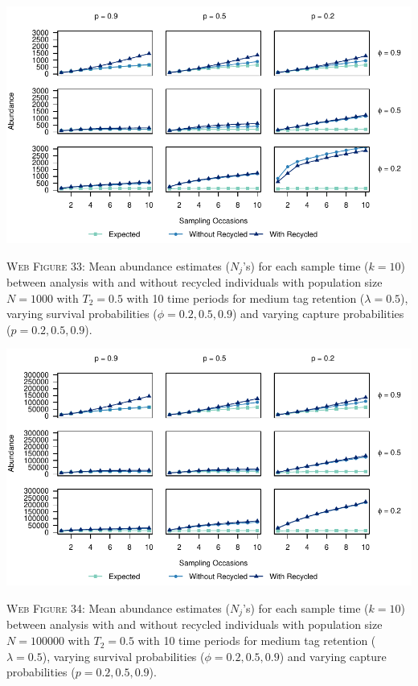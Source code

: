 \documentclass[]{article}
\begin{document}
\includegraphics{Appendix_files/figure-latex/33_abundance_M_GJSTL4-1.pdf}

\textsc{Web Figure 33:} Mean abundance estimates (\(N_j\)'s) for each
sample time (\(k=10\)) between analysis with and without recycled
individuals with population size \(N=1000\) with \(T_2=0.5\) with 10
time periods for medium tag retention (\(\lambda=0.5\)), varying
survival probabilities (\(\phi=0.2,0.5,0.9\)) and varying capture
probabilities (\(p=0.2,0.5,0.9\)).

\includegraphics{Appendix_files/figure-latex/34_abundance_M_GJSTL3-1.pdf}

\textsc{Web Figure 34:} Mean abundance estimates (\(N_j\)'s) for each
sample time (\(k=10\)) between analysis with and without recycled
individuals with population size \(N=100000\) with \(T_2=0.5\) with 10
time periods for medium tag retention (\(\lambda=0.5\)), varying
survival probabilities (\(\phi=0.2,0.5,0.9\)) and varying capture
probabilities (\(p=0.2,0.5,0.9\)).

\newpage
\end{document}
